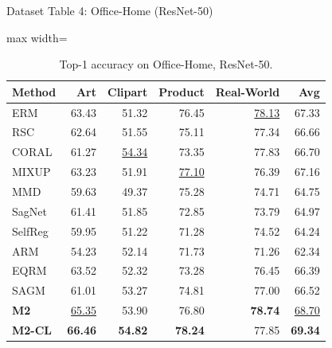 \documentclass[t, aspectratio=169]{beamer} %
\begin{document}
	\begin{frame}{Dataset Table 4: Office-Home (ResNet-50)}
\begin{table}[htbp]
\centering
\caption{Top-1 accuracy on Office-Home, ResNet-50.}
\scriptsize
\begin{adjustbox}{max width=\textwidth}
\begin{tabular}{lrrrrr}
\toprule
Method & Art & Clipart & Product & Real-World & Avg \\
\midrule
ERM & 63.43 & 51.32 & 76.45 & \underline{78.13} & 67.33 \\
RSC & 62.64 & 51.55 & 75.11 & 77.34 & 66.66 \\
CORAL & 61.27 & \underline{54.34} & 73.35 & 77.83 & 66.70 \\
MIXUP & 63.23 & 51.91 & \underline{77.10} & 76.39 & 67.16 \\
MMD & 59.63 & 49.37 & 75.28 & 74.71 & 64.75 \\
SagNet & 61.41 & 51.85 & 72.85 & 73.79 & 64.97 \\
SelfReg & 59.95 & 51.22 & 71.28 & 74.52 & 64.24 \\
ARM & 54.23 & 52.14 & 71.73 & 71.26 & 62.34 \\
EQRM & 63.52 & 52.32 & 73.28 & 76.45 & 66.39 \\
SAGM & 61.01 & 53.27 & 74.81 & 77.00 & 66.52 \\
\midrule
\textbf{M2} & \underline{65.35} & 53.90 & 76.80 & \textbf{78.74} & \underline{68.70} \\
\textbf{M2-CL} & \textbf{66.46} & \textbf{54.82} & \textbf{78.24} & 77.85 & \textbf{69.34} \\
\bottomrule
\end{tabular}
\end{adjustbox}
\end{table}
	\end{frame}
\end{document}

